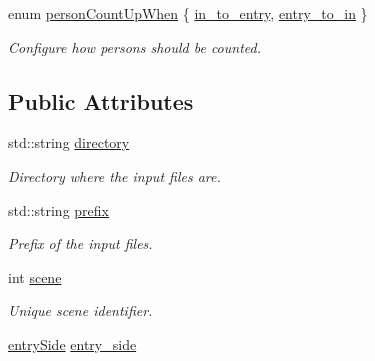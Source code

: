 \begin{DoxyCompactItemize}
enum \mbox{\hyperlink{structdto_1_1_camera_a737146d299fc52d1303ef07858ed2641}{person\+Count\+Up\+When}} \{ \mbox{\hyperlink{structdto_1_1_camera_a737146d299fc52d1303ef07858ed2641a474954d0f22a02d51c02901a277e7e3d}{in\+\_\+to\+\_\+entry}}, 
\mbox{\hyperlink{structdto_1_1_camera_a737146d299fc52d1303ef07858ed2641a42305ff776f56ef9aae4e62b3df5b9e4}{entry\+\_\+to\+\_\+in}}
 \}
\begin{DoxyCompactList}\small\item\em Configure how persons should be counted. \end{DoxyCompactList}\end{DoxyCompactItemize}
\subsection*{Public Attributes}
\begin{DoxyCompactItemize}
\item 
\mbox{\label{structdto_1_1_camera_ac6840fd3c578f493dcaf3e80732ff0e3}} 
std\+::string \mbox{\hyperlink{structdto_1_1_camera_ac6840fd3c578f493dcaf3e80732ff0e3}{directory}}
\begin{DoxyCompactList}\small\item\em Directory where the input files are. \end{DoxyCompactList}\item 
\mbox{\label{structdto_1_1_camera_a1ee2294803a5acd9f0c2cfcb6ef44cf8}} 
std\+::string \mbox{\hyperlink{structdto_1_1_camera_a1ee2294803a5acd9f0c2cfcb6ef44cf8}{prefix}}
\begin{DoxyCompactList}\small\item\em Prefix of the input files. \end{DoxyCompactList}\item 
\mbox{\label{structdto_1_1_camera_a386debb470e57607ef4562ddedb6ac7d}} 
int \mbox{\hyperlink{structdto_1_1_camera_a386debb470e57607ef4562ddedb6ac7d}{scene}}
\begin{DoxyCompactList}\small\item\em Unique scene identifier. \end{DoxyCompactList}\item 
\mbox{\label{structdto_1_1_camera_ab5a9a98c8f364891483b186672ecbfb0}} 
\mbox{\hyperlink{structdto_1_1_camera_a6f7db1fcd253e1a84a7e9ac2ffdfa525}{entry\+Side}} \mbox{\hyperlink{structdto_1_1_camera_ab5a9a98c8f364891483b186672ecbfb0}{entry\+\_\+side}}

\end{DoxyCompactItemize}
